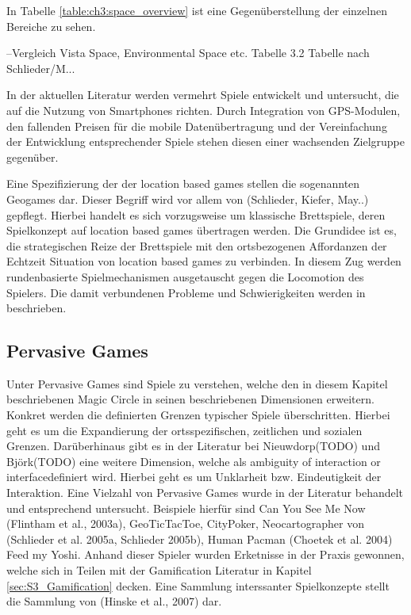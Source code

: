 In Tabelle \ref{table:ch3:space_overview} ist eine Gegenüberstellung der einzelnen Bereiche zu sehen.

--Vergleich Vista Space, Environmental Space etc. Tabelle 3.2
Tabelle nach Schlieder/M...
\label{table:ch3:space_overview}

In der aktuellen Literatur werden vermehrt Spiele entwickelt und untersucht, die auf die Nutzung von Smartphones richten. \cite{Rashid.2006a}
Durch Integration von GPS-Modulen, den fallenden Preisen für die mobile Datenübertragung und der Vereinfachung der Entwicklung entsprechender Spiele stehen diesen einer wachsenden Zielgruppe gegenüber.

Eine Spezifizierung der der location based games stellen die sogenannten Geogames dar. Dieser Begriff wird vor allem von (Schlieder, Kiefer, May..) gepflegt. Hierbei handelt es sich vorzugsweise um klassische Brettspiele, deren Spielkonzept auf location based games übertragen werden. Die Grundidee ist es, die strategischen Reize der Brettspiele mit den ortsbezogenen Affordanzen der Echtzeit Situation von location based games zu verbinden. In diesem Zug werden rundenbasierte Spielmechanismen ausgetauscht gegen die Locomotion des Spielers. Die damit verbundenen Probleme und Schwierigkeiten werden in \cite{Schlieder.2006} beschrieben.

\subsection*{Pervasive Games}

Unter Pervasive Games sind Spiele zu verstehen, welche den in diesem Kapitel beschriebenen Magic Circle in seinen beschriebenen Dimensionen erweitern.
Konkret werden die definierten Grenzen typischer Spiele überschritten. \cite{Montola.2005}
Hierbei geht es um die Expandierung der ortsspezifischen, zeitlichen und sozialen Grenzen. \cite{Montola.2009}
Darüberhinaus gibt es in der Literatur bei Nieuwdorp(TODO) und Björk(TODO) eine weitere Dimension, welche als \glqq ambiguity 
of interaction or interface\grqq definiert wird. Hierbei geht es um Unklarheit bzw. Eindeutigkeit der Interaktion.
Eine Vielzahl von Pervasive Games wurde in der Literatur behandelt und entsprechend untersucht.
Beispiele hierfür sind Can You See Me Now (Flintham et al., 2003a), GeoTicTacToe, CityPoker, Neocartographer von (Schlieder et al. 2005a, Schlieder 2005b), Human Pacman (Choetek et al. 2004) Feed my Yoshi.
Anhand dieser Spieler wurden Erketnisse in der Praxis gewonnen, welche sich in Teilen mit der Gamification Literatur in Kapitel \ref{sec:S3_Gamification} decken.
Eine Sammlung interssanter Spielkonzepte stellt die Sammlung von (Hinske et al., 2007) dar.


